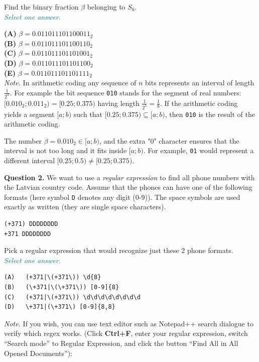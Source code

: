 \documentclass[jou]{apa6}
\begin{document}
Find the binary fraction $\beta$ belonging to $S_6$.\\
\textcolor{teal}{\em Select one answer.}

{\bf (A)} $\beta = 0.011011101100011_2$\\
{\bf (B)} $\beta = 0.011011101100110_2$\\
{\bf (C)} $\beta = 0.011011101101001_2$\\
{\bf (D)} $\beta = 0.011011101101100_2$\\
{\bf (E)} $\beta = 0.011011101101111_2$\\


{\em Note.} In arithmetic coding any sequence of 
$n$ bits represents an interval of length $\frac{1}{2^n}$.
For example the bit sequence {\tt 010} stands for the segment of real numbers:
$[0.010_2; 0.011_2) = [0.25; 0.375)$ having length $\frac{1}{2^3} = \frac{1}{8}$. 
If the arithmetic coding yields a segment $[a;b)$ such that 
$[0.25; 0.375) \subseteq [a;b)$, then {\tt 010} is the 
result of the arithmetic coding.

The number $\beta = 0.010_2 \in [a;b)$, and the extra "0"
character ensures that the interval is not too long and it fits inside $[a;b)$. 
For example, {\tt 01} would represent a different interval $[0.25; 0.5) \neq [0.25; 0.375)$. 


\vspace{10pt}
{\bf Question 2.} We want to use a {\em regular expression} 
to find all phone numbers with the Latvian country code.
Assume that the phones can have one of the following formats (here 
symbol {\tt D} denotes any digit (0-9)). The space symbols
are used exactly as written (they are single space characters).

\begin{verbatim}
(+371) DDDDDDDD
+371 DDDDDDDD
\end{verbatim}

Pick a regular expression that would recognize just these 2 phone formats.\\
\textcolor{teal}{\em Select one answer.}


\begin{verbatim}
(A)   (+371|\(+371\)) \d{8}
(B)   (\+371|\(\+371\)) [0-9]{8}
(C)   (+371|\(+371\)) \d\d\d\d\d\d\d\d
(D)   \+371|(\+371\) [0-9]{8,8}
\end{verbatim}


{\em Note.} If you wish, you can use text editor such as Notepad++ search dialogue 
to verify which regex works. (Click {\bf Ctrl+F}, 
enter your regular expression, switch ``Search mode'' to Regular Expression, 
and click the button  ``Find All in All Opened Documents''): 
\end{document}
